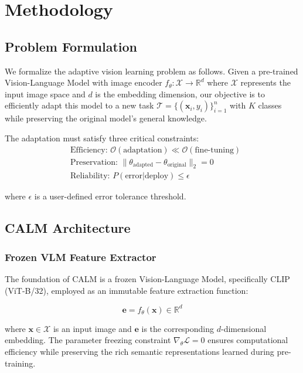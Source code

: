 \documentclass[conference]{IEEEtran}
\begin{document}
\section{Methodology}

\subsection{Problem Formulation}

We formalize the adaptive vision learning problem as follows. Given a pre-trained Vision-Language Model with image encoder $f_\theta: \mathcal{X} \rightarrow \mathbb{R}^d$ where $\mathcal{X}$ represents the input image space and $d$ is the embedding dimension, our objective is to efficiently adapt this model to a new task $\mathcal{T} = \{(\mathbf{x}_i, y_i)\}_{i=1}^n$ with $K$ classes while preserving the original model's general knowledge.

The adaptation must satisfy three critical constraints:
\begin{align}
&\text{Efficiency: } \mathcal{O}(\text{adaptation}) \ll \mathcal{O}(\text{fine-tuning}) \label{eq:efficiency}\\
&\text{Preservation: } \|\theta_{\text{adapted}} - \theta_{\text{original}}\|_2 = 0 \label{eq:preservation}\\
&\text{Reliability: } P(\text{error}|\text{deploy}) \leq \epsilon \label{eq:reliability}
\end{align}

where $\epsilon$ is a user-defined error tolerance threshold.

\subsection{CALM Architecture}

\subsubsection{Frozen VLM Feature Extractor}

The foundation of CALM is a frozen Vision-Language Model, specifically CLIP (ViT-B/32), employed as an immutable feature extraction function:

\begin{equation}
\mathbf{e} = f_\theta(\mathbf{x}) \in \mathbb{R}^d
\end{equation}

where $\mathbf{x} \in \mathcal{X}$ is an input image and $\mathbf{e}$ is the corresponding $d$-dimensional embedding. The parameter freezing constraint $\nabla_\theta \mathcal{L} = 0$ ensures computational efficiency while preserving the rich semantic representations learned during pre-training.
\end{document}
